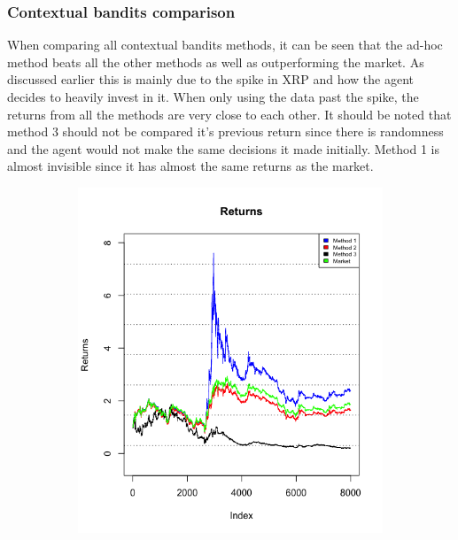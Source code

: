 \documentclass[a4paper,12pt]{article}
\begin{document}
\subsubsection{Contextual bandits comparison}
When comparing all contextual bandits methods, it can be seen that the ad-hoc method beats all the other methods as well as outperforming the market. As discussed earlier this is mainly due to the spike in XRP and how the agent decides to heavily invest in it. When only using the data past the spike, the returns from all the methods are very close to each other. It should be noted that method 3 should not be compared it’s previous return since there is randomness and the agent would not make the same decisions it made initially. Method 1 is almost invisible since it has almost the same returns as the market.

\begin{figure}[h!]
  \centering
  \begin{subfigure}[b]{0.4\linewidth}
    \includegraphics[width=\linewidth]{figures/returns.png}
  \end{subfigure}
  \begin{subfigure}[b]{0.4\linewidth}

\end{subfigure}
\end{figure}
\end{document}
